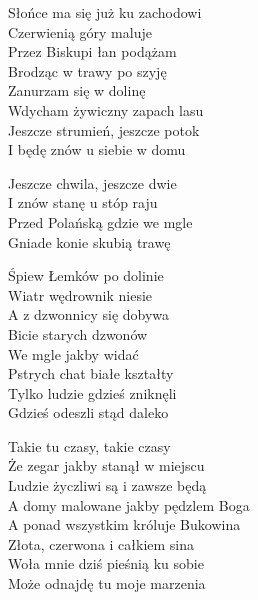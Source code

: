 \begin{text}
    Słońce ma się już ku zachodowi\\
    Czerwienią góry maluje\\
    Przez Biskupi łan podążam\\
    Brodząc w trawy po szyję\\
    Zanurzam się w dolinę\\
    Wdycham żywiczny zapach lasu\\
    Jeszcze strumień, jeszcze potok\\
    I będę znów u siebie w domu

    Jeszcze chwila, jeszcze dwie\\
    I znów stanę u stóp raju\\
    Przed Polańską gdzie we mgle\\
    Gniade konie skubią trawę

    Śpiew Łemków po dolinie\\
    Wiatr wędrownik niesie\\
    A z dzwonnicy się dobywa\\
    Bicie starych dzwonów\\
    We mgle jakby widać\\
    Pstrych chat białe kształty\\
    Tylko ludzie gdzieś zniknęli\\
    Gdzieś odeszli stąd daleko

    Takie tu czasy, takie czasy\\
    Że zegar jakby stanął w miejscu\\
    Ludzie życzliwi są i zawsze będą\\
    A domy malowane jakby pędzlem Boga\\
    A ponad wszystkim króluje Bukowina\\
    Złota, czerwona i całkiem sina\\
    Woła mnie dziś pieśnią ku sobie\\
    Może odnajdę tu moje marzenia
\end{text}
